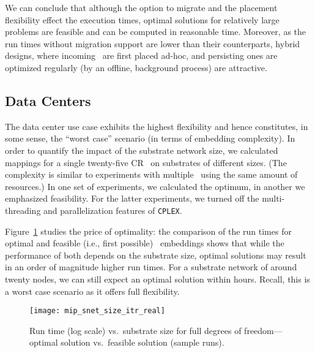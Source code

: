 \documentclass[conference,10pt]{IEEEtran}
\newcommand{\CloudNet}{\text{CloudNet}}
\newcommand{\CloudNets}{\text{CloudNets}}
\begin{document}
We can conclude that although the option to migrate and the
placement flexibility effect the execution times, optimal solutions
for relatively large problems are feasible and can be computed in
reasonable time. Moreover, as the run times without migration support
are lower than their counterparts, hybrid designs, where incoming
\CloudNets\ are first placed ad-hoc, and persisting ones are
optimized regularly (by an offline, background process) are
attractive.

\subsection{Data Centers}

The data center use case exhibits the highest flexibility and hence
constitutes, in some sense, the ``worst case'' scenario (in terms of
embedding complexity). In order to quantify the impact of the
substrate network size, we calculated mappings for a single
twenty-five CR \CloudNet\ on substrates of different sizes. (The complexity is
similar to experiments with multiple \CloudNets\ using the same amount of
resources.) In one
set of experiments, we calculated the optimum, in another we
emphasized feasibility. For the latter experiments, we turned off the
multi-threading and parallelization features of \texttt{CPLEX}.

Figure~\ref{fig:exp-substratesize} studies the price of optimality:
the comparison of the run times for optimal and feasible (i.e., first
possible) \CloudNet\ embeddings shows that while the performance of
both depends on the substrate size, optimal solutions may result in an order
of magnitude higher run times. For a substrate network of around
twenty nodes, we can still expect an optimal solution within hours.
Recall, this is a worst case scenario as it offers full flexibility.
\begin{figure} [tb]
\vspace*{-.75cm}
\begin{center}
\texttt{[image: mip\_snet\_size\_itr\_real]}\\
\caption{Run time (log scale) vs.\ substrate size for full
  degrees of freedom---optimal solution vs.\ feasible solution (sample
  runs).}\label{fig:exp-substratesize}
\end{center}
\end{figure}
\end{document}

